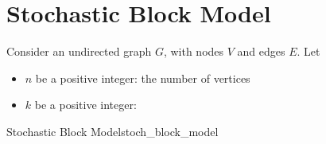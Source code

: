 \documentclass[twoside]{article}
\begin{document}

\section{Stochastic Block Model}

Consider an undirected graph $G$, with nodes $V$ and edges $E$. Let 
    \begin{itemize}
        \item $n$ be a positive integer: the number of vertices
        \item $k$ be a positive integer:
    \end{itemize}

\begin{definition}{Stochastic Block Model}{stoch_block_model}
    
\end{definition}

\newpage
%
%
\end{document}
